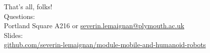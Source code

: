 \documentclass[compress]{beamer}
\begin{document}

\begin{frame}{}
    \begin{center}
        \Large
        That's all, folks!\\[2em]
        \normalsize
        Questions:\\
        Portland Square A216 or \url{severin.lemaignan@plymouth.ac.uk} \\[1em]

        Slides:\\ \href{https://github.com/severin-lemaignan/module-mobile-and-humanoid-robots}{\small github.com/severin-lemaignan/module-mobile-and-humanoid-robots}

    \end{center}
\end{frame}
\end{document}
